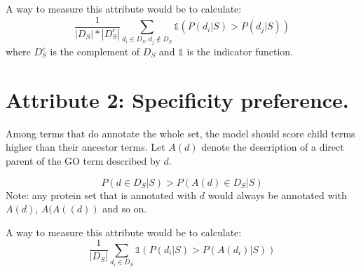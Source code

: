 \documentclass{specification}
\begin{document}

A way to measure this attribute would be to calculate:
\[\frac{1}{|D_{S}|*|D_{S}^{c}|}\sum_{d_i \in D_{S}, d_j \notin D_{S}} \mathds{1}(P(d_i | S) > P(d_j | S))\]
where $D_{S}^{c}$ is the complement of $D_{S}$ and $\mathds{1}$ is the indicator function.

\section*{Attribute 2: Specificity preference.}

Among terms that do annotate the whole set, the model should score child terms higher than their ancestor terms. Let $A(d)$ denote the description of a direct parent of the GO term described by $d$.

\[P(d \in D_{S}| S) > P(A(d) \in D_{S}| S)\]
Note: any protein set that is annotated with $d$ would always be annotated with $A(d)$, $A(A((d))$ and so on.


A way to measure this attribute would be to calculate:
\[\frac{1}{|D_{S}|}\sum_{d_i \in D_{S}} \mathds{1}(P(d_i | S) > P(A(d_i) | S))\]







\end{document}
